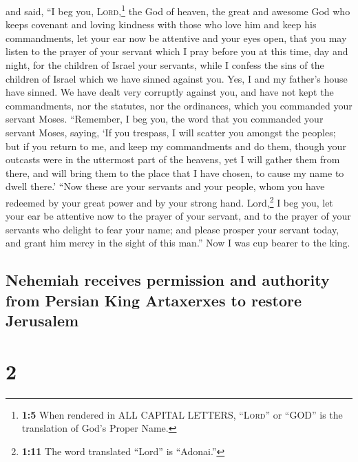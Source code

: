 and said, ``I beg you, \textsc{Lord},\footnote{\textbf{1:5}
  When rendered in ALL CAPITAL LETTERS, ``\textsc{Lord}'' or ``GOD'' is
  the translation of God's Proper Name.} the God of heaven, the great
and awesome God who keeps covenant and loving kindness with those who
love him and keep his commandments,  let your ear now be
attentive and your eyes open, that you may listen to the prayer of your
servant which I pray before you at this time, day and night, for the
children of Israel your servants, while I confess the sins of the
children of Israel which we have sinned against you. Yes, I and my
father's house have sinned.  We have dealt very corruptly
against you, and have not kept the commandments, nor the statutes, nor
the ordinances, which you commanded your servant Moses. 
``Remember, I beg you, the word that you commanded your servant Moses,
saying, `If you trespass, I will scatter you amongst the peoples;
 but if you return to me, and keep my commandments and do
them, though your outcasts were in the uttermost part of the heavens,
yet I will gather them from there, and will bring them to the place that
I have chosen, to cause my name to dwell there.'  ``Now
these are your servants and your people, whom you have redeemed by your
great power and by your strong hand.  Lord,\footnote{\textbf{1:11}
  The word translated ``Lord'' is ``Adonai.''} I beg you, let your ear
be attentive now to the prayer of your servant, and to the prayer of
your servants who delight to fear your name; and please prosper your
servant today, and grant him mercy in the sight of this man.'' Now I was
cup bearer to the king.

\hypertarget{nehemiah-receives-permission-and-authority-from-persian-king-artaxerxes-to-restore-jerusalem}{%
\subsection{Nehemiah receives permission and authority from Persian King
Artaxerxes to restore
Jerusalem}\label{nehemiah-receives-permission-and-authority-from-persian-king-artaxerxes-to-restore-jerusalem}}

\hypertarget{section-1}{%
\section{2}\label{section-1}}

